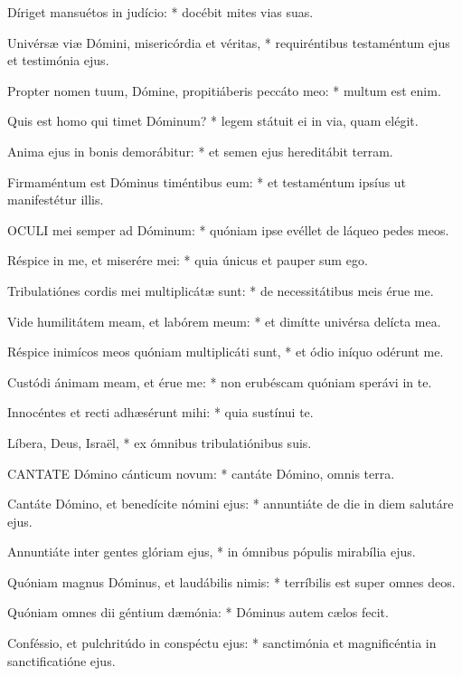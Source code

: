 Díriget mansuétos in judício: * docébit mites vias suas.

Univérsæ viæ Dómini, misericórdia et véritas, * requiréntibus testaméntum ejus et testimónia ejus.

Propter nomen tuum, Dómine, propitiáberis peccáto meo: * multum est enim.

Quis est homo qui timet Dóminum? * legem státuit ei in via, quam elégit.

Anima ejus in bonis demorábitur: * et semen ejus hereditábit terram.

Firmaméntum est Dóminus timéntibus eum: * et testaméntum ipsíus ut manifestétur illis.


\lettrine[lines=2]{O}{CULI} mei semper ad Dóminum: * quóniam ipse evéllet de láqueo pedes meos.

Réspice in me, et miserére mei: * quia únicus et pauper sum ego.

Tribulatiónes cordis mei multiplicátæ sunt: * de necessitátibus meis érue me.

Vide humilitátem meam, et labórem meum: * et dimítte univérsa delícta mea.

Réspice inimícos meos quóniam multiplicáti sunt, * et ódio iníquo odérunt me.

Custódi ánimam meam, et érue me: * non erubéscam quóniam sperávi in te.

Innocéntes et recti adhæsérunt mihi: * quia sustínui te.

Líbera, Deus, Israël, * ex ómnibus tribulatiónibus suis.



\lettrine[lines=2]{C}{ANTATE} Dómino cánticum novum: * cantáte Dómino, omnis terra.

Cantáte Dómino, et benedícite nómini ejus: * annuntiáte de die in diem salutáre ejus.

Annuntiáte inter gentes glóriam ejus, * in ómnibus pópulis mirabília ejus.

Quóniam magnus Dóminus, et laudábilis nimis: * terríbilis est super omnes deos.

Quóniam omnes dii géntium dæmónia: * Dóminus autem cælos fecit.

Conféssio, et pulchritúdo in conspéctu ejus: * sanctimónia et magnificéntia in sanctificatióne ejus.

